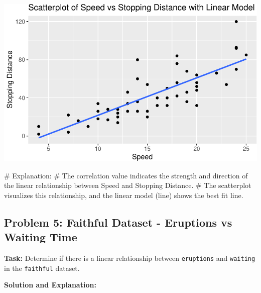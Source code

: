 \documentclass[
  letterpaper,
  DIV=11,
  numbers=noendperiod]{scrreprt}
\newenvironment{Shaded}{\begin{snugshade}}{\end{snugshade}}
\newcommand{\CommentTok}[1]{\textcolor[rgb]{0.37,0.37,0.37}{#1}}
\newcommand{\FunctionTok}[1]{\textcolor[rgb]{0.28,0.35,0.67}{#1}}
\newcommand{\NormalTok}[1]{\textcolor[rgb]{0.00,0.23,0.31}{#1}}
\newcommand{\OtherTok}[1]{\textcolor[rgb]{0.00,0.23,0.31}{#1}}
\newcommand{\SpecialCharTok}[1]{\textcolor[rgb]{0.37,0.37,0.37}{#1}}
\begin{document}
\includegraphics{Linear_Modeling_and_Regression_files/figure-pdf/unnamed-chunk-19-1.pdf}

\begin{Shaded}
\begin{Highlighting}[]
\CommentTok{\# Explanation:}
\CommentTok{\# The correlation value indicates the strength and direction of the linear relationship between Speed and Stopping Distance.}
\CommentTok{\# The scatterplot visualizes this relationship, and the linear model (line) shows the best fit line.}
\end{Highlighting}
\end{Shaded}

\subsection*{Problem 5: Faithful Dataset - Eruptions vs Waiting
Time}\label{problem-5-faithful-dataset---eruptions-vs-waiting-time-1}

\textbf{Task:} Determine if there is a linear relationship between
\texttt{eruptions} and \texttt{waiting} in the \texttt{faithful}
dataset.

\textbf{Solution and Explanation:}

\begin{Shaded}
\end{Shaded}
\end{document}
